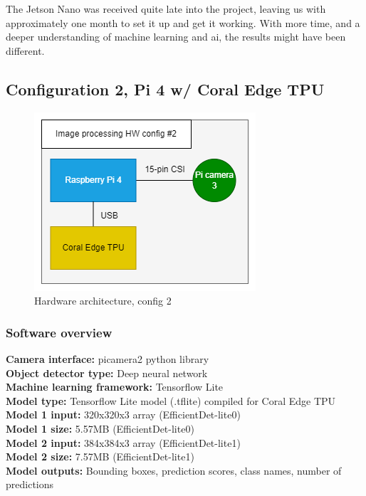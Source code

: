The Jetson Nano was received quite late into the project, leaving us with approximately one month to set it up and get it working. With more time, and a deeper understanding of machine learning and ai, the results might have been different.


\newpage

\subsection{Configuration 2, Pi 4 w/ Coral Edge TPU}

\begin{figure}[h]
    \centering
    \includegraphics[scale=0.5]{fig/config2_hw.png}
    \caption{Hardware architecture, config 2}
    \label{fig:config2_hw}
\end{figure}


\subsubsection{Software overview}

\textbf{Camera interface:} picamera2 python library\\
\textbf{Object detector type:} Deep neural network\\
\textbf{Machine learning framework:} Tensorflow Lite\\
\textbf{Model type:} Tensorflow Lite model (.tflite) compiled for Coral Edge TPU\\
\textbf{Model 1 input:} 320x320x3 array (EfficientDet-lite0)\\
\textbf{Model 1 size:} 5.57MB (EfficientDet-lite0)\\
\textbf{Model 2 input:} 384x384x3 array (EfficientDet-lite1)\\
\textbf{Model 2 size:} 7.57MB (EfficientDet-lite1)\\
\textbf{Model outputs:} Bounding boxes, prediction scores, class names, number of predictions\\


